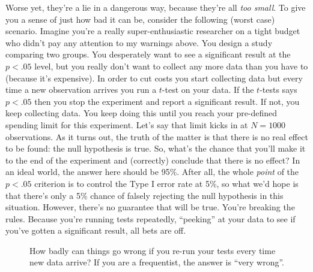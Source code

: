 Worse yet, they're a lie in a dangerous way, because they're all {\it too small}. To give you a sense of just how bad it can be, consider the following (worst case) scenario. Imagine you're a really super-enthusiastic researcher on a tight budget who didn't pay any attention to my warnings above. You design a study comparing two groups. You desperately want to see a significant result at the $p<.05$ level, but you really don't want to collect any more data than you have to (because it's expensive). In order to cut costs you start collecting data but every time a new observation arrives you run a $t$-test on your data. If the $t$-tests says $p<.05$ then you stop the experiment and report a significant result. If not, you keep collecting data. You keep doing this until you reach your pre-defined spending limit for this experiment. Let's say that limit kicks in at $N=1000$ observations. As it turns out, the truth of the matter is that there is no real effect to be found: the null hypothesis is true. So, what's the chance that you'll make it to the end of the experiment and (correctly) conclude that there is no effect? In an ideal world, the answer here should be 95\%. After all, the whole {\it point} of the $p<.05$ criterion is to control the Type I error rate at 5\%, so what we'd hope is that there's only a 5\% chance of falsely rejecting the null hypothesis in this situation. However, there's no guarantee that will be true. You're breaking the rules. Because you're running tests repeatedly, ``peeking'' at your data to see if you've gotten a significant result, all bets are off. 

\begin{figure}[t]
\begin{center}
\caption{How badly can things go wrong if you re-run your tests every time new data arrive? If you are a frequentist, the answer is ``very wrong''.}
\label{fig:type1}
\HR
\end{center}
\end{figure}

